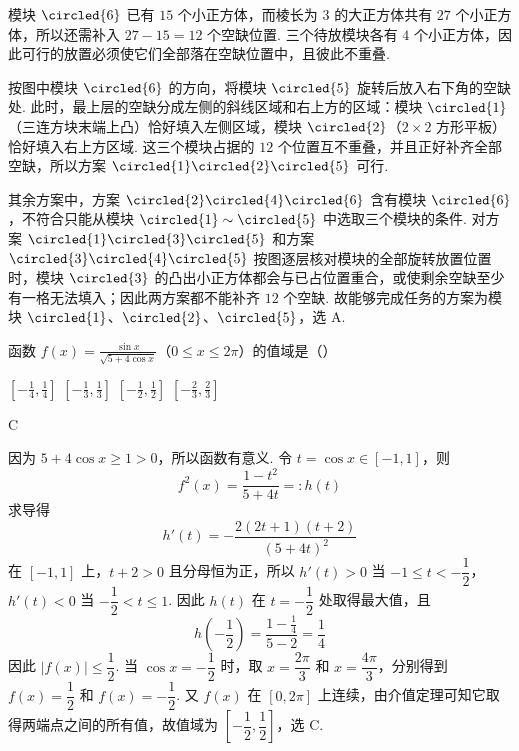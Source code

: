 \begin{solution}
模块 \(\circled{6}\) 已有 \(15\) 个小正方体，而棱长为 \(3\) 的大正方体共有 \(27\) 个小正方体，所以还需补入 \(27-15=12\) 个空缺位置. 三个待放模块各有 \(4\) 个小正方体，因此可行的放置必须使它们全部落在空缺位置中，且彼此不重叠.

按图中模块 \(\circled{6}\) 的方向，将模块 \(\circled{5}\) 旋转后放入右下角的空缺处. 此时，最上层的空缺分成左侧的斜线区域和右上方的区域：模块 \(\circled{1}\)（三连方块末端上凸）恰好填入左侧区域，模块 \(\circled{2}\)（\(2\times2\) 方形平板）恰好填入右上方区域. 这三个模块占据的 \(12\) 个位置互不重叠，并且正好补齐全部空缺，所以方案 \(\circled{1}\circled{2}\circled{5}\) 可行.

其余方案中，方案 \(\circled{2}\circled{4}\circled{6}\) 含有模块 \(\circled{6}\)，不符合只能从模块 \(\circled{1}\sim\circled{5}\) 中选取三个模块的条件. 对方案 \(\circled{1}\circled{3}\circled{5}\) 和方案 \(\circled{3}\circled{4}\circled{5}\) 按图逐层核对模块的全部旋转放置位置时，模块 \(\circled{3}\) 的凸出小正方体都会与已占位置重合，或使剩余空缺至少有一格无法填入；因此两方案都不能补齐 \(12\) 个空缺. 故能够完成任务的方案为模块 \(\circled{1}\)、\(\circled{2}\)、\(\circled{5}\)，选 A.
\end{solution}

\begin{problem}
函数 \( f(x) = \frac{\sin x}{\sqrt{5 + 4\cos x}} \)（\(0 \leqslant x \leqslant 2\pi\)）的值域是（\quad）

\choices
    {\( \left[-\frac{1}{4},\frac{1}{4}\right] \)}
    {\( \left[-\frac{1}{3},\frac{1}{3}\right] \)}
    {\( \left[-\frac{1}{2},\frac{1}{2}\right] \)}
    {\(\left[-\frac{2}{3},\frac{2}{3}\right]\)}
\end{problem}

\begin{answer}
C
\end{answer}

\begin{solution}
因为 \(5+4\cos x\geqslant1>0\)，所以函数有意义. 令 \(t=\cos x\in[-1,1]\)，则
\[
f^{2}(x)=\frac{1-t^{2}}{5+4t}=:h(t)
\]
求导得
\[
h'(t)=-\frac{2(2t+1)(t+2)}{(5+4t)^{2}}
\]
在 \([-1,1]\) 上，\(t+2>0\) 且分母恒为正，所以 \(h'(t)>0\) 当 \(-1\leqslant t<-\dfrac12\)，\(h'(t)<0\) 当 \(-\dfrac12<t\leqslant1\). 因此 \(h(t)\) 在 \(t=-\dfrac12\) 处取得最大值，且
\[
h\left(-\frac12\right)=\frac{1-\frac14}{5-2}=\frac14
\]
因此 \(|f(x)|\leqslant\dfrac12\). 当 \(\cos x=-\dfrac12\) 时，取 \(x=\dfrac{2\pi}{3}\) 和 \(x=\dfrac{4\pi}{3}\)，分别得到 \(f(x)=\dfrac12\) 和 \(f(x)=-\dfrac12\). 又 \(f(x)\) 在 \([0,2\pi]\) 上连续，由介值定理可知它取得两端点之间的所有值，故值域为 \(\left[-\dfrac12,\dfrac12\right]\)，选 C.
\end{solution}

